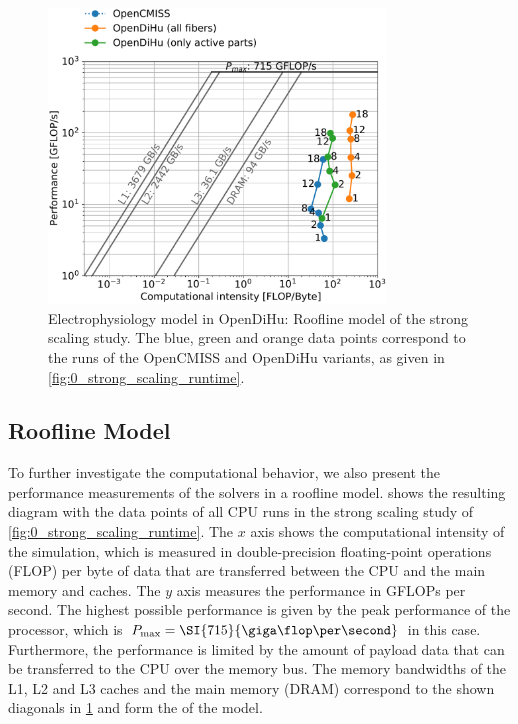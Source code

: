 \begin{figure}[H]
  \centering%
  \includegraphics[width=0.8\textwidth]{images/results/studies/0_roofline.pdf}%
  \caption{Electrophysiology model in OpenDiHu: Roofline model of the strong scaling study. The blue, green and orange data points correspond to the runs of the OpenCMISS and OpenDiHu variants, as given in \cref{fig:0_strong_scaling_runtime}.}%
  \label{fig:0_roofline}%
\end{figure}%

\subsection{Roofline Model}\label{sec:roofline_model}
To further investigate the computational behavior, we also present the performance measurements of the solvers in a roofline model. 
 shows the resulting diagram with the data points of all CPU runs in the strong scaling study of \cref{fig:0_strong_scaling_runtime}. The $x$ axis shows the computational intensity of the simulation, which is measured in double-precision floating-point operations (FLOP) per byte of data that are transferred between the CPU and the main memory and caches. The $y$ axis measures the performance in GFLOPs per second. The highest possible performance is given by the peak performance of the processor, which is $P_\text{max} = \SI{715}{\giga\flop\per\second}$ in this case. Furthermore, the performance is limited by the amount of payload data that can be transferred to the CPU over the memory bus. The memory bandwidths of the L1, L2 and L3 caches and the main memory (DRAM) correspond to the shown diagonals in \cref{fig:0_roofline} and form the  of the model.

